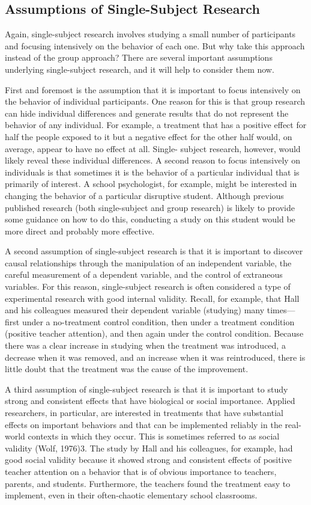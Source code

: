 \subsection{Assumptions of Single-Subject Research}

Again, single-subject research involves studying a small number of participants and focusing intensively on the behavior of each one. But why take this approach instead of the group approach? There are several important assumptions underlying single-subject research, and it will help to consider them now.

First and foremost is the assumption that it is important to focus intensively on the behavior of individual participants. One reason for this is that group research can hide individual differences and generate results that do not represent the behavior of any individual. For example, a treatment that has a positive effect for half the people exposed to it but a negative effect for the other half would, on average, appear to have no effect at all. Single- subject research, however, would likely reveal these individual differences. A second reason to focus intensively on individuals is that sometimes it is the behavior of a particular individual that is primarily of interest. A school psychologist, for example, might be interested in changing the behavior of a particular disruptive student. Although previous published research (both single-subject and group research) is likely to provide some guidance on how to do this, conducting a study on this student would be more direct and probably more effective.

A second assumption of single-subject research is that it is important to discover causal relationships through the manipulation of an independent variable, the careful measurement of a dependent variable, and the control of
extraneous variables. For this reason, single-subject research is often considered a type of experimental research with good internal validity. Recall, for example, that Hall and his colleagues measured their dependent variable (studying) many times---first under a no-treatment control condition, then under a treatment condition (positive teacher attention), and then again under the control condition. Because there was a clear increase in studying when the treatment was introduced, a decrease when it was removed, and an increase when it was reintroduced, there is little doubt that the treatment was the cause of the improvement.

A third assumption of single-subject research is that it is important to study strong and consistent effects that have biological or social importance. Applied researchers, in particular, are interested in treatments that have substantial effects on important behaviors and that can be implemented reliably in the real-world contexts in which they occur. This is sometimes referred to as social validity (Wolf, 1976)3. The study by Hall and his colleagues, for example, had good social validity because it showed strong and consistent effects of positive teacher attention on a behavior that is of obvious importance to teachers, parents, and students. Furthermore, the teachers found the treatment easy to implement, even in their often-chaotic elementary school classrooms.

